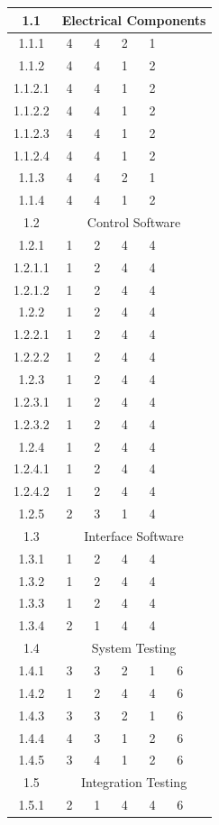 \begin{longtable}{|c|c|c|c|c|c|c|}
	\hline 1.1 & \multicolumn{6}{c|}{Electrical Components} \\ \hline
	1.1.1  &4&4&2&1&  \\ \hline
	1.1.2  &4&4&1&2&  \\ \hline
	1.1.2.1&4&4&1&2&  \\ \hline
	1.1.2.2 &4&4&1&2&  \\ \hline
	1.1.2.3 &4&4&1&2&  \\ \hline
	1.1.2.4 &4&4&1&2&  \\ \hline
	1.1.3  &4&4&2&1&\\ \hline
	1.1.4  &4&4&1&2&   \\ \hline
	\hline 1.2 & \multicolumn{6}{c|}{Control Software} \\ \hline
	1.2.1  &1&2&4&4&   \\ \hline
	1.2.1.1 &1&2&4&4 &  \\ \hline
	1.2.1.2 &1&2&4&4&  \\ \hline
	1.2.2  &1&2&4&4& \\ \hline
	1.2.2.1 &1&2&4&4&   \\ \hline
	1.2.2.2 &1&2&4&4&   \\ \hline
	1.2.3 &1&2&4&4& \\ \hline
	1.2.3.1 &1&2&4&4&  \\ \hline
	1.2.3.2 &1&2&4&4&  \\ \hline
	1.2.4  &1&2&4&4&\\ \hline
	1.2.4.1 &1&2&4&4& \\ \hline
	1.2.4.2 &1&2&4&4& \\ \hline
	1.2.5 &2&3&1&4& \\ \hline
	\hline 1.3 & \multicolumn{6}{c|}{Interface Software} \\ \hline
	1.3.1  &1& 2&4 &4 & \\ \hline
	1.3.2  &1& 2& 4& 4& \\ \hline
	1.3.3 & 1&2& 4& 4& \\ \hline
	1.3.4  &2&1 & 4&4 &\\ \hline
	\hline 1.4 & \multicolumn{6}{c|}{System Testing} \\ \hline
	1.4.1  &3&3&2&1&6\\ \hline
	1.4.2  &1&2&4&4&6\\ \hline
	1.4.3  &3&3&2&1&6\\ \hline
	1.4.4  &4&3&1&2&6\\ \hline
	1.4.5  &3&4&1&2&6\\ \hline
	\hline 1.5 & \multicolumn{6}{c|}{Integration Testing} \\ \hline
	1.5.1  &2&1&4&4&6\\ \hline

\end{longtable}
